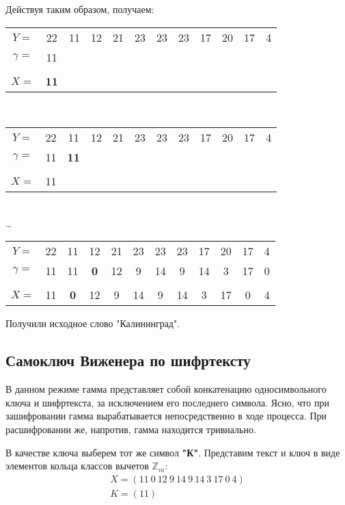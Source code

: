 Действуя таким образом, получаем:
\begin{table*}[h!]
    \centering
    \begin{tabular}{c*{11}{@{\;}c}}
        $Y =$ & 22 & 11 & 12 & 21 & 23 & 23 & 23 & 17 & 20 & 17 & 4 \\[4pt]
        $\gamma =$ & 11 &   &   &   &   &   &   &   &   &   &   \\[4pt]
      \hline \\ [-1.5ex]
        $X =$ & {\bf 11} &   &   &   &   &   &   &   &   &   &   \\[4pt]
    \end{tabular} \\[2ex]
    \begin{tabular}{c*{11}{@{\;}c}}
        $Y =$ & 22 & 11 & 12 & 21 & 23 & 23 & 23 & 17 & 20 & 17 & 4 \\[4pt]
        $\gamma =$ & 11 & {\bf 11} &   &   &   &   &   &   &   &   &   \\[4pt]
      \hline \\ [-1.5ex]
        $X =$ & 11 &   &   &   &   &   &   &   &   &   &   \\[4pt]
    \end{tabular} \\
    \dots \\[2ex]
    \begin{tabular}{c*{11}{@{\;}c}}
        $Y =$ & 22 & 11 & 12 & 21 & 23 & 23 & 23 & 17 & 20 & 17 & 4 \\[4pt]
        $\gamma =$ & 11 & 11 & {\bf 0} & 12 & 9 & 14 & 9 & 14 & 3 & 17 & 0 \\[4pt]
      \hline \\ [-1.5ex]
        $X =$ & 11 & {\bf 0} & 12 & 9 & 14 & 9 & 14 & 3 & 17 & 0 & 4 \\[4pt]
    \end{tabular}
\end{table*}

Получили исходное слово "Калининград".


\subsection{Самоключ Виженера по шифртексту}
В данном режиме гамма представляет собой конкатенацию односимвольного ключа и шифртекста, за исключением его последнего символа. Ясно, что при зашифровании гамма вырабатывается непосредственно в ходе процесса. При расшифровании же, напротив, гамма находится тривиально. 

В качестве ключа выберем тот же символ {\bf "К"}. Представим текст и ключ в виде элементов кольца классов вычетов $\mathbb{Z}_m$:
\begin{gather*}
    X = (11 \ 0 \ 12 \ 9 \ 14 \ 9 \ 14 \ 3 \ 17 \ 0 \ 4) \\
    K = (11)
\end{gather*}

